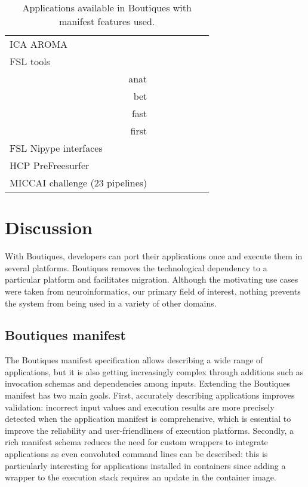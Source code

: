 \documentclass{article}
\newcommand{\boutiques}{Boutiques\xspace}
\begin{document}
\begin{table}
\begin{tabular}{l|ccc|ccc}
    ICA AROMA                       &\cellcolor{gray!75} &            &         &              &&\\
    FSL tools &&&&&\\
    \multicolumn{1}{r|}{anat}       &                    &            &         &              &&\\
    \multicolumn{1}{r|}{bet}        &                    &            &         &              &&\\
    \multicolumn{1}{r|}{fast}       &                    &            &         &              &&\\
    \multicolumn{1}{r|}{first}      &                    &            &         &              &&\\
    FSL Nipype interfaces     \\
    HCP PreFreesurfer               &\cellcolor{gray!75} &            &         &             &&\\
    MICCAI challenge (23 pipelines) &\cellcolor{gray!75} &            &         &             &&\\
  \end{tabular} 
  \caption{Applications available in Boutiques with manifest features used.}
  \label{table:applications}
\end{table}

\section{Discussion}

With Boutiques, developers can port their applications once and execute
them in several platforms. \boutiques removes the technological dependency to a
particular platform and facilitates migration.  Although the
motivating use cases were taken from neuroinformatics, our primary
field of interest, nothing prevents the system from being used in a
variety of other domains.


\subsection{\boutiques manifest}

The \boutiques manifest specification allows describing a wide range
of applications, but it is also getting increasingly complex through
additions such as invocation schemas and dependencies among
inputs. Extending the \boutiques manifest has two main goals. First,
accurately describing applications improves validation: incorrect input
values and execution results are more precisely detected when the
application manifest is comprehensive, which is essential to improve
the reliability and user-friendliness of execution
platforms. Secondly, a rich manifest schema reduces the need for
custom wrappers to integrate applications as even convoluted command
lines can be described: this is particularly interesting for
applications installed in containers since adding a wrapper to the
execution stack requires an update in the container image.
\end{document}

